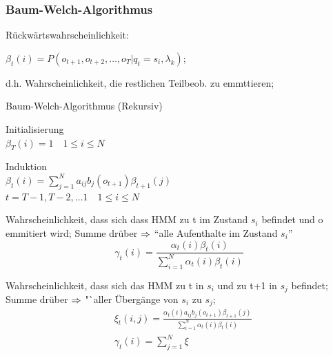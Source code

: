 \documentclass[german,color,6pt]{latex4ei/latex4ei_sheet}
\begin{document}
\begin{sectionbox}
\subsubsection{Baum-Welch-Algorithmus}
Rückwärtswahrscheinlichkeit:

 $\beta_t(i) = P(o_{t+1}, o_{t+2}, \dots , o_{T} | q_t = s_i , \lambda _k)$;

d.h. Wahrscheinlichkeit, die restlichen Teilbeob. zu emmttieren;

\begin{cookbox}{Baum-Welch-Algorithmus (Rekursiv)}
	\item Initialisierung\\
		 $\beta_T (i) = 1 \quad 1 \leq i \leq N $\\
	\item Induktion\\
		$\beta_t(i) = \sum\limits_{j=1}^N a_{ij} b_j (o_{t+1}) \beta_{t+1} (j)$\\
		$t = T-1, T-2, \dots 1 \quad 1 \leq i \leq N$\\
\end{cookbox}

Wahrscheinlichkeit, dass sich dass HMM zu t im Zustand $s_i$ befindet und o emmitiert wird; Summe drüber $\Rightarrow$  "`alle Aufenthalte im Zustand $s_i$"'
\begin{equation*}
\gamma _t (i) = \frac{\alpha_t (i) \beta_t (i)}{\sum \limits_{i=1}^N \alpha_t (i) \beta_t (i)}
\end{equation*}

Wahrscheinlichkeit, dass sich das HMM zu t in $s_i$ und zu t+1 in $s_j$ befindet; Summe drüber $\Rightarrow$ "`aller Übergänge von $s_i$ zu $s_j$;
\begin{equation*}
\begin{split}
&\xi_t (i,j) = \frac{\alpha _t (i) a_{ij} b_j (o_{t+1}) \beta_{t+1}(j)}{\sum \limits_{i=1}^N \alpha_t (i) \beta_t (i)}\\
&\gamma_t (i) = \sum\limits_{j=1}^N \xi
\end{split}
\end{equation*}

\end{sectionbox}
\end{document}
